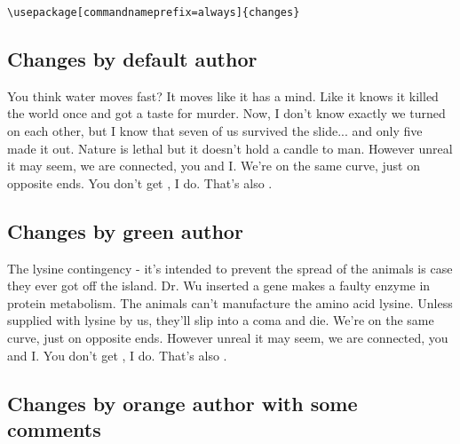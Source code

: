 \documentclass[11pt, a4paper, notitlepage, english]{article}
\begin{document}
\verb|\usepackage[commandnameprefix=always]{changes}|




















\subsection*{Changes by default author}

You think water moves fast?
It moves like it has a mind.
Like it knows it killed the world once and got a taste for murder.
Now, I don't know exactly  we turned on each other, but I know that seven of us survived the slide... and only five made it out.
Nature is lethal but it doesn't hold a candle to man.
However unreal it may seem, we are connected, you and I.
We're on the same curve, just on opposite ends.
You don't get , I do.
That's also .

\subsection*{Changes by green author}

The lysine contingency - it's intended to prevent the spread of the animals is case they ever got off the island.
Dr. Wu inserted a gene  makes a  faulty enzyme in protein metabolism.
The animals can't manufacture the amino acid lysine.
Unless  supplied with lysine by us, they'll slip into a coma and die.
We're on the same curve, just on opposite ends.
However unreal it may seem, we are connected, you and I.
You don't get , I do.
That's also .

\subsection*{Changes by orange author with some comments}
\end{document}
